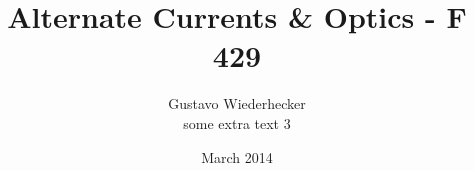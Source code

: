 \title[]{Alternate Currents \& Optics - F 429}

\author[Gustavo Wiederhecker]{
Gustavo Wiederhecker\\
\vspace{10pt}
some extra text 3
}

\date{March 2014}